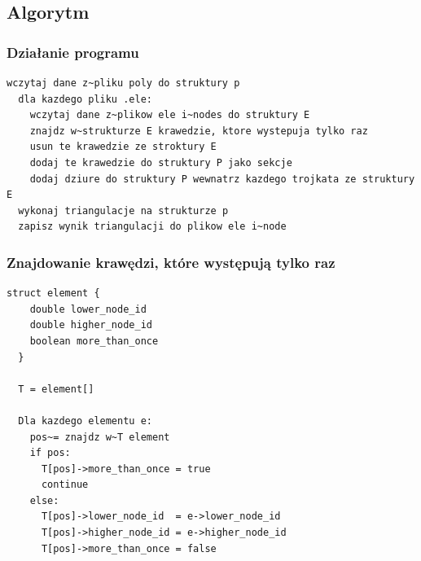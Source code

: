 \documentclass[a4paper]{article}
\begin{document}
\subsection{Algorytm}
\subsubsection{Działanie programu}
\begin{lstlisting}[caption=Przykładowe wywołanie]
  wczytaj dane z~pliku poly do struktury p
  dla kazdego pliku .ele:
    wczytaj dane z~plikow ele i~nodes do struktury E
    znajdz w~strukturze E krawedzie, ktore wystepuja tylko raz
    usun te krawedzie ze stroktury E
    dodaj te krawedzie do struktury P jako sekcje
    dodaj dziure do struktury P wewnatrz kazdego trojkata ze struktury E
  wykonaj triangulacje na strukturze p
  zapisz wynik triangulacji do plikow ele i~node
\end{lstlisting}

\subsubsection{Znajdowanie krawędzi, które występują tylko raz}
\begin{lstlisting}[caption=Przykładowe wywołanie]
  struct element {
    double lower_node_id
    double higher_node_id
    boolean more_than_once
  }

  T = element[]

  Dla kazdego elementu e:
    pos~= znajdz w~T element
    if pos:
      T[pos]->more_than_once = true
      continue
    else:
      T[pos]->lower_node_id  = e->lower_node_id
      T[pos]->higher_node_id = e->higher_node_id
      T[pos]->more_than_once = false
\end{lstlisting}
\end{document}
